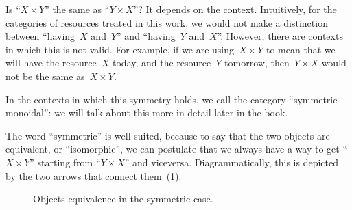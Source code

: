     Is ``$X \times Y$'' the same as ``$Y \times X$''?
    It depends on the context. Intuitively, for the categories of resources treated in this work, we would not make a distinction between ``having~$X$ and~$Y$'' and ``having~$Y$ and~$X$''.
    However, there are contexts in which this is not valid. For example, if we are
    using~$X \times Y$ to mean that we will have the resource~$X$ today, and the
    resource~$Y$ tomorrow, then~$Y \times X$ would not be the same as~$X \times Y$.

    In the contexts in which this symmetry holds, we call the category ``symmetric monoidal'': we will talk about this more in detail later in the book.

    The word ``symmetric'' is well-suited, because to say that the two objects are equivalent, or ``isomorphic'', we can postulate that we always have a way to get
    ``$X \times Y$'' starting from ``$Y \times X$'' and viceversa. Diagrammatically, this is depicted by the two arrows that connect them~(\cref{fig:e17}).

    \begin{figure}[h!]
        \centering
        \caption{Objects equivalence in the symmetric case. }
        \label{fig:e17}
    \end{figure}


